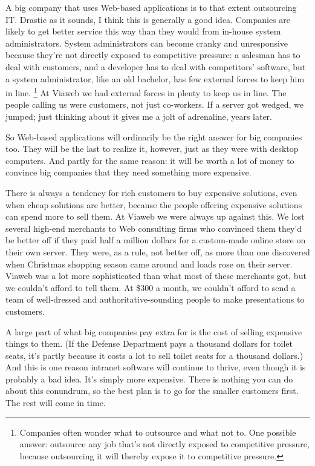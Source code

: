 \documentclass[12pt]{book}
\begin{document}
A big company that uses Web-based applications is to that extent
outsourcing IT. Drastic as it sounds, I think this is generally a good
idea. Companies are likely to get better service this way than they
would from in-house system administrators. System administrators can
become cranky and unresponsive because they're not directly exposed to
competitive pressure: a salesman has to deal with customers, and a
developer has to deal with competitors' software, but a system
administrator, like an old bachelor, has few external forces to keep him
in line. \footnote{Companies often wonder what to outsource and what not to. One
possible answer: outsource any job that's not directly exposed to
competitive pressure, because outsourcing it will thereby expose it to
competitive pressure.} At Viaweb we had external forces in plenty to keep us
in line. The people calling us were customers, not just co-workers. If a
server got wedged, we jumped; just thinking about it gives me a jolt of
adrenaline, years later.

So Web-based applications will ordinarily be the right answer for big
companies too. They will be the last to realize it, however, just as
they were with desktop computers. And partly for the same reason: it
will be worth a lot of money to convince big companies that they need
something more expensive.

There is always a tendency for rich customers to buy expensive
solutions, even when cheap solutions are better, because the people
offering expensive solutions can spend more to sell them. At Viaweb we
were always up against this. We lost several high-end merchants to Web
consulting firms who convinced them they'd be better off if they paid
half a million dollars for a custom-made online store on their own
server. They were, as a rule, not better off, as more than one
discovered when Christmas shopping season came around and loads rose on
their server. Viaweb was a lot more sophisticated than what most of
these merchants got, but we couldn't afford to tell them. At \$300 a
month, we couldn't afford to send a team of well-dressed and
authoritative-sounding people to make presentations to customers.

A large part of what big companies pay extra for is the cost of selling
expensive things to them. (If the Defense Department pays a thousand
dollars for toilet seats, it's partly because it costs a lot to sell
toilet seats for a thousand dollars.) And this is one reason intranet
software will continue to thrive, even though it is probably a bad idea.
It's simply more expensive. There is nothing you can do about this
conundrum, so the best plan is to go for the smaller customers first.
The rest will come in time.
\end{document}
